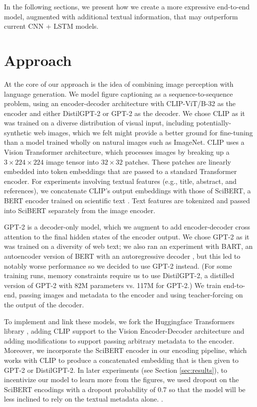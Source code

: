 \documentclass{article}
\begin{document}
In the following sections, we present how we create a more expressive end-to-end model, augmented with additional textual information, that may outperform current CNN + LSTM models.

\section{Approach}

At the core of our approach is the idea of combining image perception with language generation. We model figure captioning as a sequence-to-sequence problem, using an encoder-decoder architecture with CLIP-ViT/B-32 \citep{DBLP:journals/corr/abs-2103-00020} as the encoder and either DistilGPT-2 or GPT-2 \citep{radford2019language} as the decoder. We chose CLIP as it was trained on a diverse distribution of visual input, including potentially-synthetic web images, which we felt might provide a better ground for fine-tuning than a model trained wholly on natural images such as ImageNet. CLIP uses a Vision Transformer architecture, which processes images by breaking up a $3 \times 224 \times 224$ image tensor into $32 \times 32$ patches. These patches are linearly embedded into token embeddings that are passed to a standard Transformer encoder. For experiments involving textual features (e.g., title, abstract, and references), we concatenate CLIP's output embeddings with those of SciBERT, a BERT encoder trained on scientific text \citep{Beltagy2019SciBERT}. Text features are tokenized and passed into SciBERT separately from the image encoder.

GPT-2 is a decoder-only model, which we augment to add encoder-decoder cross attention to the final hidden states of the encoder output. We chose GPT-2 as it was trained on a diversity of web text; we also ran an experiment with BART, an autoencoder version of BERT with an autoregressive decoder \citep{lewis-etal-2020-bart}, but this led to notably worse performance so we decided to use GPT-2 instead. (For some training runs, memory constraints require us to use DistilGPT-2, a distilled version of GPT-2 with 82M parameters vs. 117M for GPT-2.) We train end-to-end, passing images and metadata to the encoder and using teacher-forcing on the output of the decoder.

To implement and link these models, we fork the Huggingface Transformers library \citep{wolf-etal-2020-transformers}, adding CLIP support to the Vision Encoder-Decoder architecture and adding modifications to support passing arbitrary metadata to the encoder. Moreover, we incorporate the SciBERT encoder in our encoding pipeline, which works with CLIP to produce a concatenated embedding that is then given to GPT-2 or DistilGPT-2. In later experiments (see Section \ref{sec:results}), to incentivize our model to learn more from the figures, we used dropout on the SciBERT encodings with a dropout probability of 0.7 so that the model will be less inclined to rely on the textual metadata alone.
\citep{Falcon_PyTorch_Lightning_2019}.
\end{document}
